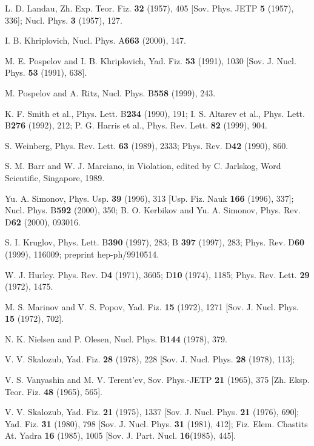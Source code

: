 \documentclass[a4paper,12pt]{article}
\begin{document}
\begin{thebibliography}{99}
\bibitem{}  L. D. Landau, Zh. Exp. Teor. Fiz. \textbf{32} (1957), 405 [Sov.
Phys. JETP \textbf{5} (1957), 336]; Nucl. Phys. \textbf{3} (1957), 127.

\bibitem{}  I. B. Khriplovich, Nucl. Phys. A\textbf{663} (2000), 147.

\bibitem{}  M. E. Pospelov and I. B. Khriplovich, Yad. Fiz. \textbf{53}
(1991), 1030 [Sov. J. Nucl. Phys. \textbf{53} (1991), 638].

\bibitem{}  M. Pospelov and A. Ritz, Nucl. Phys. B\textbf{558} (1999), 243.

\bibitem{}  K. F. Smith et al., Phys. Lett. B\textbf{234} (1990), 191; I. S.
Altarev et al., Phys. Lett. B\textbf{276} (1992), 212; P. G. Harris et al.,
Phys. Rev. Lett. \textbf{82} (1999), 904.

\bibitem{}  S. Weinberg, Phys. Rev. Lett. \textbf{63} (1989), 2333; Phys.
Rev. D\textbf{42} (1990), 860.

\bibitem{}  S. M. Barr and W. J. Marciano, in \coordHE{} Violation, edited by C.
Jarlskog, Word Scientific, Singapore, 1989.

\bibitem{}  Yu. A. Simonov, Phys. Usp. \textbf{39} (1996), 313 [Usp. Fiz.
Nauk \textbf{166} (1996), 337]; Nucl. Phys. B\textbf{592} (2000), 350; B. O.
Kerbikov and Yu. A. Simonov, Phys. Rev. D\textbf{62} (2000), 093016.

\bibitem{}  S. I. Kruglov, Phys. Lett. B\textbf{390} (1997), 283; B\textbf{
397} (1997), 283; Phys. Rev. D\textbf{60} (1999), 116009; preprint
hep-ph/9910514.

\bibitem{}  W. J. Hurley. Phys. Rev. D\textbf{4} (1971), 3605; D\textbf{10}
(1974), 1185; Phys. Rev. Lett. \textbf{29} (1972), 1475.

\bibitem{}  M. S. Marinov and V. S. Popov, Yad. Fiz. \textbf{15} (1972),
1271 [Sov. J. Nucl. Phys. \textbf{15} (1972), 702].

\bibitem{}  N. K. Nielsen and P. Olesen, Nucl. Phys. B\textbf{144} (1978),
379.

\bibitem{}  V. V. Skalozub, Yad. Fiz. \textbf{28} (1978), 228 [Sov. J. Nucl.
Phys. \textbf{28} (1978), 113];

\bibitem{}  V. S. Vanyashin and M. V. Terent'ev, Sov. Phys.-JETP \textbf{21}
(1965), 375 [Zh. Eksp. Teor. Fiz. \textbf{48} (1965), 565].

\bibitem{}  V. V. Skalozub, Yad. Fiz. \textbf{21} (1975), 1337 [Sov. J.
Nucl. Phys. \textbf{21} (1976), 690]; Yad. Fiz. \textbf{31 }(1980), 798
[Sov. J. Nucl. Phys. \textbf{31} (1981), 412]; Fiz. Elem. Chastits At. Yadra
\textbf{16} (1985), 1005 [Sov. J. Part. Nucl. \textbf{16}(1985), 445].


\end{thebibliography}
\end{document}
